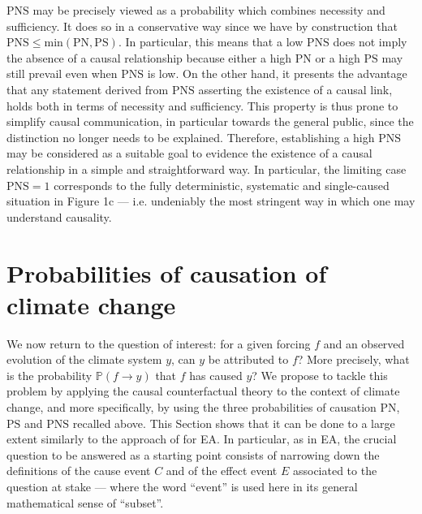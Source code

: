\documentclass[12pt]{article}
\newcommand{\PN}{\textrm{PN}}
\newcommand{\PS}{\textrm{PS}}
\newcommand{\PNS}{\textrm{PNS}}
\newcommand{\Proba}{\mathbb P}
\begin{document}
$\PNS$ may be precisely viewed as a probability which combines necessity and sufficiency. It does so in a conservative way since we have by construction that $\PNS\leq\textrm{min}(\PN,\PS)$. In particular, this means that a low $\PNS$ does not imply the absence of a causal relationship because either a high $\PN$ or a high $\PS$ may still prevail even when $\PNS$ is low. On the other hand, it presents the advantage that any statement derived from $\PNS$ asserting the existence of a causal link, holds both in terms of necessity and sufficiency. This property is thus prone to simplify causal communication, in particular towards the general public, since the distinction no longer needs to be explained. Therefore, establishing a high $\PNS$ may be considered as a suitable goal to evidence the existence of a causal relationship in a simple and straightforward way. In particular, the limiting case $\PNS=1$ corresponds to the fully deterministic, systematic and single-caused situation in Figure 1c --- i.e. undeniably the most stringent way in which one may understand causality.


\section{Probabilities of causation of climate change}

We now return to the question of interest: for a given forcing $f$ and an observed evolution of the climate system $y$, can $y$ be attributed to $f$? More precisely, what is the probability $\Proba(f\rightarrow y)$ that $f$ has caused $y$? We propose to tackle this problem by applying the causal counterfactual theory to the context of climate change, and more specifically, by using the three probabilities of causation $\PN$, $\PS$ and $\PNS$ recalled above. This Section shows that it can be done to a large extent similarly to the approach of \cite{HPONG15} for EA. 
In particular, as in EA, the crucial question to be answered as a starting point consists of narrowing down the definitions of the cause event $C$ and of the effect event $E$ associated to the question at stake --- where the word ``event'' is used here in its general mathematical sense of ``subset''.%
\end{document}
